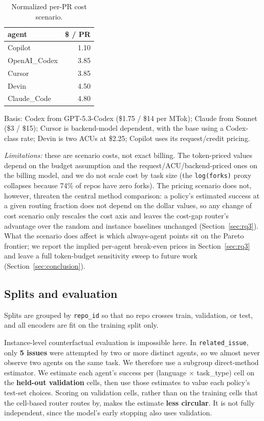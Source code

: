 \documentclass[sigconf,nonacm]{acmart}
\begin{document}
\begin{table}[h]
  \centering
  \caption{Normalized per-PR cost scenario.}
  \begin{tabular}{lr}
    \toprule
    agent & \$ / PR \\
    \midrule
    Copilot & 1.10 \\
    OpenAI\_Codex & 3.85 \\
    Cursor & 3.85 \\
    Devin & 4.50 \\
    Claude\_Code & 4.80 \\
    \bottomrule
  \end{tabular}
\end{table}

Basis: Codex from GPT-5.3-Codex (\$1.75 / \$14 per MTok); Claude from Sonnet (\$3 / \$15); Cursor is backend-model dependent, with the base using a Codex-class rate; Devin is two ACUs at \$2.25; Copilot uses its request/credit pricing.

\emph{Limitations:} these are scenario costs, not exact billing. The token-priced values depend on the budget assumption and the request/ACU/backend-priced ones on the billing model, and we do not scale cost by task size (the \texttt{log(forks)} proxy collapses because 74\% of repos have zero forks). The pricing scenario does not, however, threaten the central method comparison: a policy's estimated success at a given routing fraction does not depend on the dollar values, so any change of cost scenario only rescales the cost axis and leaves the cost-gap router's advantage over the random and instance baselines unchanged (Section~\ref{sec:rq3}). What the scenario does affect is which always-agent points sit on the Pareto frontier; we report the implied per-agent break-even prices in Section~\ref{sec:rq3} and leave a full token-budget sensitivity sweep to future work (Section~\ref{sec:conclusion}).

\subsection{Splits and evaluation}\label{sec:splits}

Splits are grouped by \texttt{repo\_id} so that no repo crosses train, validation, or test, and all encoders are fit on the training split only.

Instance-level counterfactual evaluation is impossible here. In \texttt{related\_issue}, only \textbf{5 issues} were attempted by two or more distinct agents, so we almost never observe two agents on the same task. We therefore use a subgroup direct-method estimator. We estimate each agent's success per (language $\times$ task\_type) cell on the \textbf{held-out validation} cells, then use those estimates to value each policy's test-set choices. Scoring on validation cells, rather than on the training cells that the cell-based router routes by, makes the estimate \textbf{less circular}. It is not fully independent, since the model's early stopping also uses validation.
\end{document}

